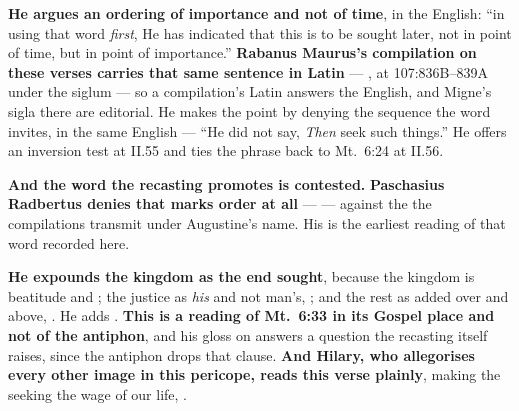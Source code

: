 \begin{witnessnote}
 \textbf{He argues an ordering of importance and not of time}, in the
 English: ``in using that
word \emph{first}, He has indicated that this is to be sought later, not in
point of time, but in point of importance.'' \textbf{Rabanus Maurus's
compilation on these verses carries that same sentence in Latin} ---
, at 
107:836B--839A under the siglum  --- so a compilation's Latin
answers the English, and Migne's sigla there are editorial. He makes the point by denying
the sequence the word invites, in the same English --- ``He did not say,
\emph{Then} seek such
things.'' He offers an inversion test at II.55 and ties the phrase back to
Mt.\ 6:24 at II.56.
\end{witnessnote}

\textbf{And the word the recasting promotes is contested.} \textbf{Paschasius
Radbertus denies that  marks order at all} ---  --- against
the  the compilations transmit under
Augustine's name. His is the earliest reading of that word recorded here.

\begin{witnessnote}
 \textbf{He expounds the kingdom as
the end sought}, because the kingdom is beatitude and ; the
justice as \emph{his} and not man's, ; and the rest as added over and above, . He adds . \textbf{This is a reading of Mt.\ 6:33 in its Gospel place and not of
the antiphon}, and his gloss on  answers a question the
recasting itself raises, since the antiphon drops that clause. \textbf{And Hilary,
who allegorises every other image in this pericope, reads this verse plainly},
making the seeking the wage of our life, .
\end{witnessnote}

